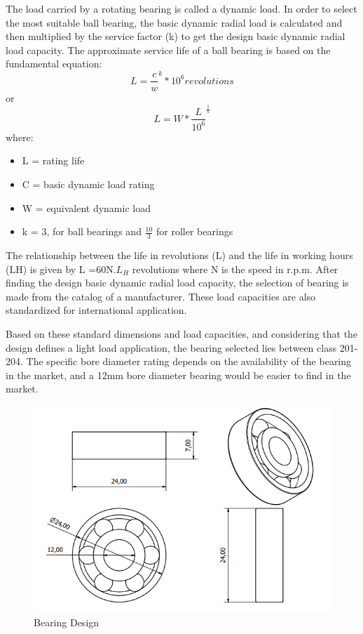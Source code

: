 \par
The load carried by a rotating bearing is called a dynamic load. In order to select the most suitable ball bearing, the basic dynamic radial load is calculated and then multiplied by the service factor (k) to get the design basic dynamic radial load capacity. 
The approximate service life of a ball bearing is based on the fundamental equation\cite{khurmi_textbook_2005}:
\begin{equation}
    L= \frac{c}{w}^k * 10^6 revolutions
\end{equation}
or
\begin{equation}
    L = W * \frac{L}{10^6}^{\frac{1}{k}}
\end{equation}
where:
\begin{itemize}
    \item L = rating life
    \item C = basic dynamic load rating
    \item W = equivalent dynamic load
    \item k = 3, for ball bearings and \(\frac{10}{3}\) for roller bearings
\end{itemize}

\par
The relationship between the life in revolutions (L) and the life in working hours (LH) is given by L =60N.\(L_H\) revolutions  where N is the speed in r.p.m.
After finding the design basic dynamic radial load capacity, the selection of bearing is made from the catalog of a manufacturer. These load capacities are also standardized for international application.

\par
Based on these standard dimensions and load capacities, and considering that the design defines a light load application, the bearing selected lies between class 201-204. The specific bore diameter rating depends on the availability of the bearing in the market, and a 12mm bore diameter bearing would be easier to find in the market. 

\begin{figure}[H]
    \centering
    \includegraphics[scale= 0.8]{Figures/BearingDWG.png}
    \caption{Bearing Design}
    \label{fig:bearing}
\end{figure}

